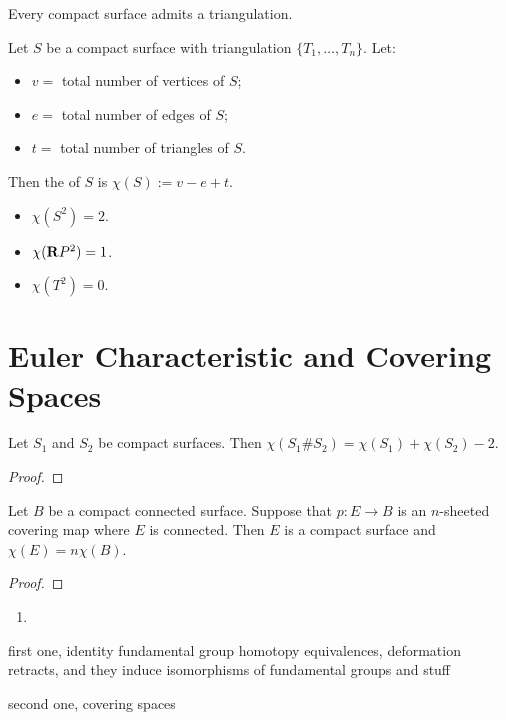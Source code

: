 \begin{theorem}
	Every compact surface admits a triangulation.
\end{theorem}

\begin{definition}
	Let $S$ be a compact surface with triangulation $\{T_1,\ldots, T_n\}$. Let:
	\mbox{}
	\begin{itemize}[itemsep=1pt,topsep=3pt]
		\item $v = $ total number of vertices of $S$;
		\item $e = $ total number of edges of $S$;
		\item $t = $ total number of triangles of $S$.
	\end{itemize}
	Then the  of $S$ is $\chi(S) := v - e + t$.
\end{definition}

\begin{example}
	\mbox{}
	\begin{itemize}[itemsep=1pt,topsep=3pt]
		\item $\chi(S^2) = 2$.
		\item $\chi(\mathbf{R} P^2) = 1$.
		\item $\chi(T^2) = 0$.
	\end{itemize}
\end{example}

\section{Euler Characteristic and Covering Spaces}

\begin{proposition}
	Let $S_1$ and $S_2$ be compact surfaces. Then $\chi(S_1 \# S_2) = \chi(S_1) + \chi(S_2) - 2$.
\end{proposition}
	{\color{red}
	\begin{proof}
			
	\end{proof}}

\begin{proposition}
	Let $B$ be a compact connected surface. Suppose that $p:E \rightarrow B$ is an $n$-sheeted covering map where $E$ is connected. Then $E$ is a compact surface and $\chi(E) = n \chi(B)$.
\end{proposition}
	{\color{red}
	\begin{proof}
			
	\end{proof}}

\begin{proposition}
	\mbox{}
	\begin{enumerate}[label = (\alph*),itemsep=1pt,topsep=3pt]
		\item 
	\end{enumerate}
\end{proposition}




first one, identity fundamental group
homotopy equivalences, deformation retracts, and they induce isomorphisms of fundamental groups and stuff


second one, covering spaces
